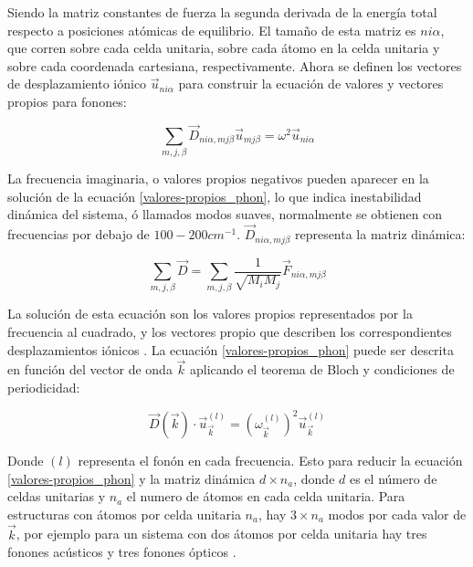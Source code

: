 Siendo la matriz constantes de fuerza la segunda derivada de la energía total respecto a posiciones atómicas de equilibrio. El tamaño de esta matriz es $ni\alpha$, que corren sobre cada celda unitaria, sobre cada átomo en la celda unitaria y sobre cada coordenada cartesiana, respectivamente. Ahora se definen los vectores de desplazamiento iónico $\vec{u}_{ni\alpha}$ para construir la ecuación de valores y vectores propios para fonones:

\begin{equation}
    \sum_{m,j,\beta}\vec{D}_{ni\alpha,mj\beta}\vec{u}_{mj\beta}=\omega^{2}\vec{u}_{ni\alpha}
    \label{valores-propios_phon}
\end{equation}

La frecuencia imaginaria, o valores propios negativos pueden aparecer en la solución de la ecuación \ref{valores-propios_phon}, lo que indica inestabilidad dinámica del sistema, ó llamados modos suaves, normalmente se obtienen con frecuencias por debajo de $100-200cm^{-1}$. $\vec{D}_{ni\alpha,mj\beta}$ representa la matriz dinámica:

\begin{equation}
    \sum_{m,j,\beta}\vec{D}=\sum_{m,j,\beta}\frac{1}{\sqrt{M_{i}M_{j}}}\vec{F}_{ni\alpha,mj\beta}
\end{equation}

La solución de esta ecuación son los valores propios representados por la frecuencia al cuadrado, y los vectores propio que describen los correspondientes desplazamientos iónicos \cite{kaxirasjoannopoulos2019}. La ecuación \ref{valores-propios_phon} puede ser descrita en función del vector de onda $\vec{k}$ aplicando el teorema de Bloch y condiciones de periodicidad:

\begin{equation}
    \vec{D}(\vec{k})\cdot\vec{u}_{\vec{k}}^{(l)}=\left(\omega_{\vec{k}}^{(l)}\right)^{2}\vec{u}_{\vec{k}}^{(l)}
    \label{valores-propios_phon-k}
\end{equation}

Donde $(l)$ representa el fonón en cada frecuencia. Esto para reducir la ecuación \ref{valores-propios_phon} y la matriz dinámica $d\times n_{a}$, donde $d$ es el número de celdas unitarias y $n_{a}$ el numero de átomos en cada celda unitaria. Para estructuras con átomos por celda unitaria $n_{a}$, hay $3\times n_{a}$ modos por cada valor de $\vec{k}$, por ejemplo para un sistema con dos átomos por celda unitaria hay tres fonones acústicos y tres fonones ópticos \cite{kaxirasjoannopoulos2019}.
